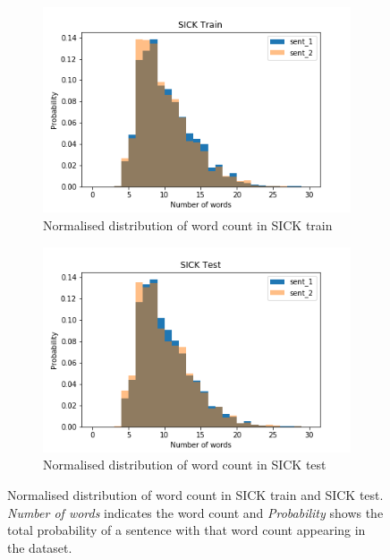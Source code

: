 \begin{enumerate}
\begin{figure}
	\captionsetup[subfigure]{justification=centering}
	\centering
	\begin{subfigure}[b]{.5\textwidth}
		\centering
		\includegraphics[width=\textwidth]{figures/semantic_textual_similarity/introduction/sick_train_words.png}
		\caption{Normalised distribution of word count in SICK train}
		\label{fig:sick_train_words}
	\end{subfigure}%
	\begin{subfigure}[b]{.5\textwidth}
		\centering
		\includegraphics[width=\textwidth]{figures/semantic_textual_similarity/introduction/sick_test_words.png}
		\caption{Normalised distribution of word count in SICK test}
		\label{fig:sick_test_words}
	\end{subfigure}
	\caption[Normalised distribution of word count in SICK train and SICK test.]{Normalised distribution of word count in SICK train and SICK test. \textit{Number of words} indicates the word count and \textit{Probability} shows the total probability of a sentence with that word count appearing in the dataset.}
	\label{fig:sick_words}
\end{figure}



\end{enumerate}
